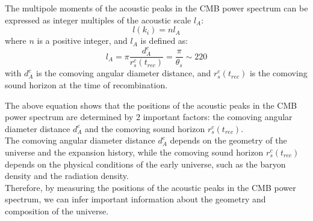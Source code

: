 \begin{theory}
    The multipole moments of the acoustic peaks in the CMB power spectrum can be expressed as integer multiples of the acoustic scale $l_A$:
    \[
        l(k_i) = n l_A
    \]
    where $n$ is a positive integer, and $l_A$ is defined as:
    \[
        l_A = \pi \frac{d_A^c}{r_s^c(t_{rec})} = \frac{\pi}{\theta_s} \sim 220
    \]
    with $d_A^c$ is the comoving angular diameter distance, and $r_s^c(t_{rec})$ is the comoving sound horizon at the time of recombination.
\end{theory}

\clearpage
\begin{intuition}
    The above equation shows that the positions of the acoustic peaks in the CMB power spectrum are determined by 2 important factors: the comoving angular diameter distance $d_A^c$ and the comoving sound horizon $r_s^c(t_{rec})$. \\
    
    The comoving angular diameter distance $d_A^c$ depends on the geometry of the universe and the expansion history, while the comoving sound horizon $r_s^c(t_{rec})$ depends on the physical conditions of the early universe, such as the baryon density and the radiation density. \\
    
    Therefore, by measuring the positions of the acoustic peaks in the CMB power spectrum, we can infer important information about the geometry and composition of the universe.
\end{intuition}

